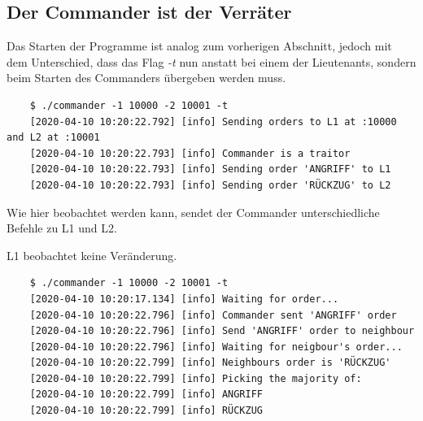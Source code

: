 \documentclass{article}
\begin{document}
\subsection{Der Commander ist der Verräter}

Das Starten der Programme ist analog zum vorherigen Abschnitt, jedoch mit dem Unterschied, dass das 
Flag \textit{-t} nun anstatt bei einem der Lieutenants, sondern beim Starten des Commanders 
übergeben werden muss.

\begin{center}
    \begin{verbatim}
    $ ./commander -1 10000 -2 10001 -t
    [2020-04-10 10:20:22.792] [info] Sending orders to L1 at :10000 and L2 at :10001
    [2020-04-10 10:20:22.793] [info] Commander is a traitor
    [2020-04-10 10:20:22.793] [info] Sending order 'ANGRIFF' to L1
    [2020-04-10 10:20:22.793] [info] Sending order 'RÜCKZUG' to L2
    \end{verbatim}
\end{center}

Wie hier beobachtet werden kann, sendet der Commander unterschiedliche Befehle zu L1 und L2. 

\medskip 

L1 beobachtet keine Veränderung. 

\begin{center}
    \begin{verbatim}
    $ ./commander -1 10000 -2 10001 -t
    [2020-04-10 10:20:17.134] [info] Waiting for order...
    [2020-04-10 10:20:22.796] [info] Commander sent 'ANGRIFF' order
    [2020-04-10 10:20:22.796] [info] Send 'ANGRIFF' order to neighbour
    [2020-04-10 10:20:22.796] [info] Waiting for neigbour's order...
    [2020-04-10 10:20:22.799] [info] Neighbours order is 'RÜCKZUG'
    [2020-04-10 10:20:22.799] [info] Picking the majority of:
    [2020-04-10 10:20:22.799] [info] ANGRIFF
    [2020-04-10 10:20:22.799] [info] RÜCKZUG
    \end{verbatim}
\end{center}

\newpage

\printbibliography
\end{document}
